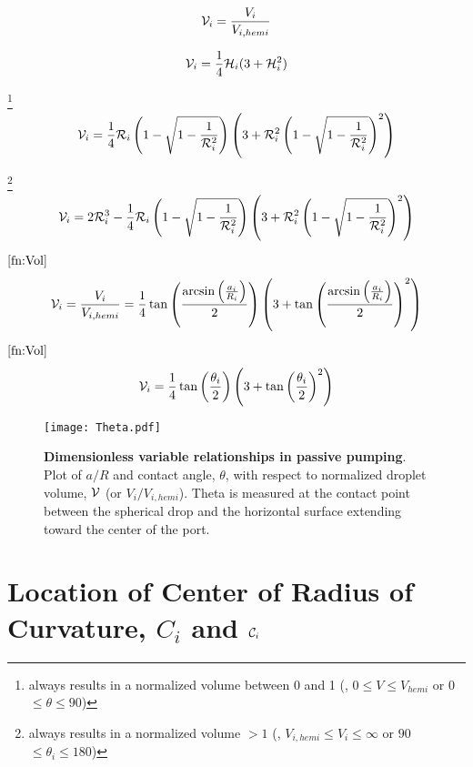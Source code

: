 \begin{equation}
\V_{i}=\frac{V_{i}}{V_{i,hemi}}
\end{equation}

\begin{equation}
\V_{i}=\frac{1}{4}\h_{i}(3+\h_{i}^2)
\end{equation}

\footnote{always results in a normalized volume between 0 and 1 (\ie , $0\le V\le V_{hemi}$ or $0$\Deg$\le\theta\le90$\Deg)\label{fn:Vol}}
\begin{equation}
\V_{i}=\frac{1}{4}\R_{i}\left(1-\sqrt{1-\frac{1}{\R_{i}^{2}}}\right)\left(3+\R_{i}^{2}\left(1-\sqrt{1-\frac{1}{\R_{i}^{2}}}\right)^{2}\right)
\label{equ:VofR1}
\end{equation}

\footnote{always results in a normalized volume $> 1$ (\ie , $V_{i,hemi}\le V_{i}\le\infty$ or $90$\Deg$\le\theta_{i}\le180$\Deg)}
\begin{equation}
\V_{i}=2\R_{i}^3 - \frac{1}{4}\R_{i}\left(1-\sqrt{1-\frac{1}{\R_{i}^{2}}}\right)\left(3+\R_{i}^{2}\left(1-\sqrt{1-\frac{1}{\R_{i}^{2}}}\right)^{2}\right)
\label{equ:VofR2}
\end{equation}

$^{\ref{fn:Vol}}$
\begin{equation}
\V_{i}=\frac{V_{i}}{V_{i,hemi}}=\frac{1}{4}\tan\left(\frac{\arcsin\left(\frac{a_{i}}{R_{i}}\right)}{2}\right)\left(3+{\tan\left(\frac{\arcsin\left(\frac{a_{i}}{R_{i}}\right)}{2}\right)}^{2}\right)
\label{equ:VofR3}
\end{equation}

$^{\ref{fn:Vol}}$
\begin{equation}
\V_{i}=\frac{1}{4}\tan\left(\frac{\theta_{i}}{2}\right)\left(3+{\tan\left(\frac{\theta_{i}}{2}\right)}^{2}\right)
\end{equation}

\begin{figure}[!ht]
\centering
\texttt{[image: Theta.pdf]}
\caption{\textbf{Dimensionless variable relationships in passive pumping}. Plot of $a/R$ and contact angle, $\theta$, with respect to normalized droplet volume, $\mathcal{V}$ (or $V_{i}/V_{i,hemi}$). Theta is measured at the contact point between the spherical drop and the horizontal surface extending toward the center of the port.}
\end{figure}

\section{\texorpdfstring{Location of Center of Radius of Curvature, $C_{i}$ and $\mathcal{C}_{i}$}{Location of Center of Radius of Curvature, Ci and Ci}}

